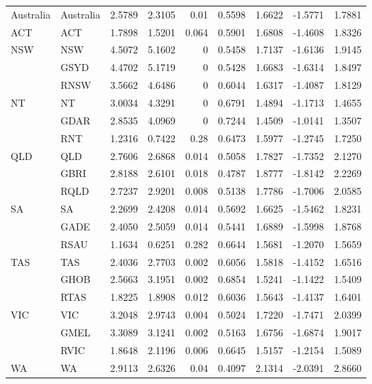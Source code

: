 \begin{table}[htbp]
{\begin{tabular}{llrrrrrrr}
    
    Australia & Australia & 2.5789 & 2.3105 & 0.01  & 0.5598 & 1.6622 & -1.5771 & 1.7881 \\
    ACT   & ACT   & 1.7898 & 1.5201 & 0.064 & 0.5901 & 1.6808 & -1.4608 & 1.8326 \\
    \multirow{3}[0]{*}{NSW} & NSW   & 4.5072 & 5.1602 & 0     & 0.5458 & 1.7137 & -1.6136 & 1.9145 \\
          & GSYD  & 4.4702 & 5.1719 & 0     & 0.5428 & 1.6683 & -1.6314 & 1.8497 \\
          & RNSW  & 3.5662 & 4.6486 & 0     & 0.6044 & 1.6317 & -1.4087 & 1.8129 \\
    \multirow{3}[0]{*}{NT} & NT    & 3.0034 & 4.3291 & 0     & 0.6791 & 1.4894 & -1.1713 & 1.4655 \\
          & GDAR  & 2.8535 & 4.0969 & 0     & 0.7244 & 1.4509 & -1.0141 & 1.3507 \\
          & RNT   & 1.2316 & 0.7422 & 0.28  & 0.6473 & 1.5977 & -1.2745 & 1.7250 \\
    \multirow{3}[0]{*}{QLD} & QLD   & 2.7606 & 2.6868 & 0.014 & 0.5058 & 1.7827 & -1.7352 & 2.1270 \\
          & GBRI  & 2.8188 & 2.6101 & 0.018 & 0.4787 & 1.8777 & -1.8142 & 2.2269 \\
          & RQLD  & 2.7237 & 2.9201 & 0.008 & 0.5138 & 1.7786 & -1.7006 & 2.0585 \\
    \multirow{3}[0]{*}{SA} & SA    & 2.2699 & 2.4208 & 0.014 & 0.5692 & 1.6625 & -1.5462 & 1.8231 \\
          & GADE  & 2.4050 & 2.5059 & 0.014 & 0.5441 & 1.6889 & -1.5998 & 1.8768 \\
          & RSAU  & 1.1634 & 0.6251 & 0.282 & 0.6644 & 1.5681 & -1.2070 & 1.5659 \\
    \multirow{3}[0]{*}{TAS} & TAS   & 2.4036 & 2.7703 & 0.002 & 0.6056 & 1.5818 & -1.4152 & 1.6516 \\
          & GHOB  & 2.5663 & 3.1951 & 0.002 & 0.6854 & 1.5241 & -1.1422 & 1.5409 \\
          & RTAS  & 1.8225 & 1.8908 & 0.012 & 0.6036 & 1.5643 & -1.4137 & 1.6401 \\
    \multirow{3}[0]{*}{VIC} & VIC   & 3.2048 & 2.9743 & 0.004 & 0.5024 & 1.7220 & -1.7471 & 2.0399 \\
          & GMEL  & 3.3089 & 3.1241 & 0.002 & 0.5163 & 1.6756 & -1.6874 & 1.9017 \\
          & RVIC  & 1.8648 & 2.1196 & 0.006 & 0.6645 & 1.5157 & -1.2154 & 1.5089 \\
    \multirow{3}[1]{*}{WA} & WA    & 2.9113 & 2.6326 & 0.04  & 0.4097 & 2.1314 & -2.0391 & 2.8660 \\

\end{tabular}}
\end{table}
